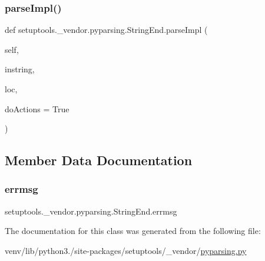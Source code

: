 \subsubsection{\texorpdfstring{parse\+Impl()}{parseImpl()}}
{\footnotesize\ttfamily def setuptools.\+\_\+vendor.\+pyparsing.\+String\+End.\+parse\+Impl (\begin{DoxyParamCaption}\item[{}]{self,  }\item[{}]{instring,  }\item[{}]{loc,  }\item[{}]{do\+Actions = {\ttfamily True} }\end{DoxyParamCaption})}



\subsection{Member Data Documentation}
\mbox{\label{classsetuptools_1_1__vendor_1_1pyparsing_1_1StringEnd_a8f2f9feb85aeecaecb6f4a5470637b3f}} 
\subsubsection{\texorpdfstring{errmsg}{errmsg}}
{\footnotesize\ttfamily setuptools.\+\_\+vendor.\+pyparsing.\+String\+End.\+errmsg}



The documentation for this class was generated from the following file\+:\begin{DoxyCompactItemize}
\item 
venv/lib/python3./site-\/packages/setuptools/\+\_\+vendor/\hyperlink{setuptools_2__vendor_2pyparsing_8py}{pyparsing.\+py}\end{DoxyCompactItemize}
